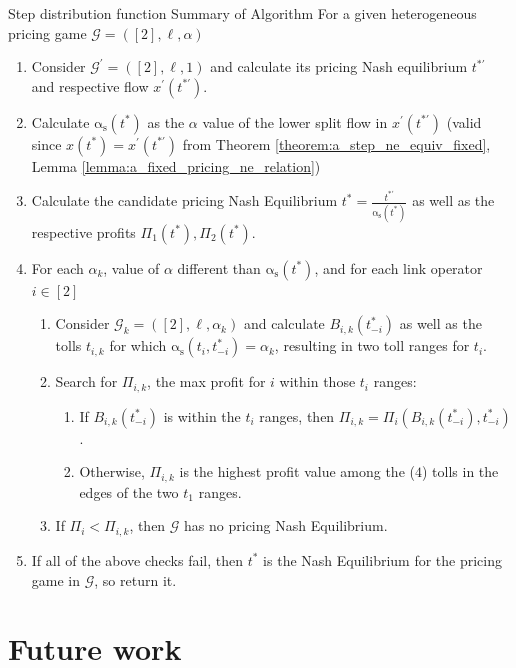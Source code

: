 \documentclass{beamer}
\newcommand{\as}{\mathrm{\alpha_s}}
\newcommand{\Gm}{\mathcal{G}}
\begin{document}
\begin{frame}{Step distribution function}
	Summary of Algorithm
	For a given heterogeneous pricing game $\Gm = ([2], \ell, \alpha)$
	\begin{enumerate}
		\item Consider $\Gm^\prime = ([2], \ell, 1)$ and calculate its pricing Nash equilibrium $t^{*\prime}$ and respective flow $x^\prime(t^{*\prime})$.
		\item Calculate $\as(t^*)$ as the $\alpha$ value of the lower split flow in $x^\prime(t^{*\prime})$ (valid since $x(t^*) = x^\prime(t^{*\prime})$ from Theorem \ref{theorem:a_step_ne_equiv_fixed}, Lemma \ref{lemma:a_fixed_pricing_ne_relation})
		\item Calculate the candidate pricing Nash Equilibrium $t^* = \tfrac{t^{*\prime}}{\as(t^*)}$ as well as the respective profits $\Pi_1(t^*), \Pi_2(t^*)$.
		\item For each $\alpha_k$, value of $\alpha$ different than $\as(t^*)$, and for each link operator $i \in [2]$
		\begin{enumerate}[$4.1$]
			\item Consider $\Gm_k = ([2], \ell, \alpha_k)$ and calculate $B_{i, k}(t_{-i}^*)$ as well as the tolls $t_{i, k}$ for which $\as(t_i, t_{-i}^*) = \alpha_k$, resulting in two toll ranges for $t_i$.
			\item Search for $\Pi_{i, k}$, the max profit for $i$ within those $t_i$ ranges:
			\begin{enumerate}[$4.2.1$]
				\item If $B_{i, k}(t_{-i}^*)$ is within the $t_i$ ranges, then $\Pi_{i, k} = \Pi_i(B_{i, k}(t_{-i}^*), t_{-i}^*)$.
				\item Otherwise, $\Pi_{i, k}$ is the highest profit value among the ($4$) tolls in the edges of the two $t_1$ ranges.
			\end{enumerate}
			\item If $\Pi_i < \Pi_{i, k}$, then $\Gm$ has no pricing Nash Equilibrium.
		\end{enumerate}
		\item If all of the above checks fail, then $t^*$ is the Nash Equilibrium for the pricing game in $\Gm$, so return it.
	\end{enumerate}
\end{frame}

\section{Future work}
\end{document}
